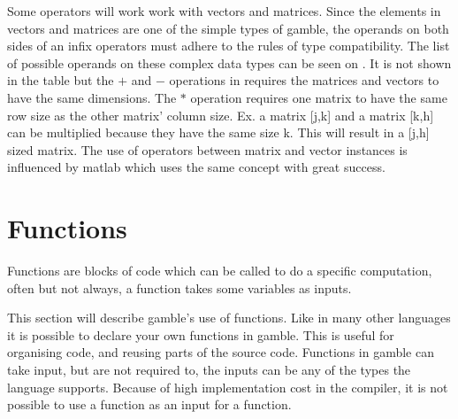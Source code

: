 
Some operators will work work with vectors and matrices.
Since the elements in vectors and matrices are one of the simple types of \gls{gamble}, the operands on both sides of an infix operators must adhere to the rules of type compatibility.
The list of possible operands on these complex data types can be seen on .
It is not shown in the table but the $+$ and $-$ operations in  requires the matrices and vectors to have the same dimensions.
The $*$ operation requires one matrix to have the same row size as the other matrix' column size. Ex. a matrix [j,k] and a matrix [k,h] can be multiplied because they have the same size k.
This will result in a [j,h] sized matrix.
The use of operators between matrix and vector instances is influenced by matlab which uses the same concept with great success.


\section{Functions}\label{sec:funcs}
Functions are blocks of code which can be called to do a specific computation, often but not always, a function takes some variables as inputs.

This section will describe \gls{gamble}'s use of functions. 
Like in many other languages it is possible to declare your own functions in \gls{gamble}.
This is useful for organising code, and reusing parts of the source code.
Functions in \gls{gamble} can take input, but are not required to, the inputs can be any of the types the language supports.
Because of high implementation cost in the compiler, it is not possible to use a function as an input for a function.

